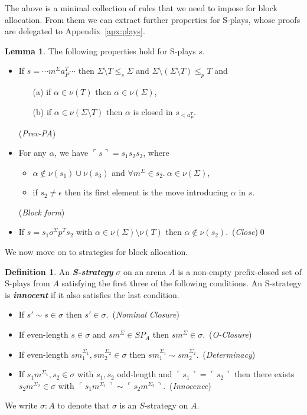 \documentclass{CSML}
\theoremstyle{definition}\newtheorem{definition}[thm]{Definition}
\theoremstyle{definition}\newtheorem{example}[thm]{Example}
\theoremstyle{definition}\newtheorem{proposition}[thm]{Proposition}
\theoremstyle{definition}\newtheorem{lemma}[thm]{Lemma}
\theoremstyle{definition}\newtheorem{theorem}[thm]{Theorem}
\theoremstyle{definition}\newtheorem{corollary}[thm]{Corollary}
\theoremstyle{definition}\newtheorem{remark}[thm]{Remark}
\newcommand\nt[1]{#1}
\renewcommand\Sigma{\varSigma}
\newcommand\Tau{T}
\newcommand\remv{\setminus}
\newcommand\Splays[1]{\mathit{SP}_{#1}}
\newcommand\boldemph[1]{\emph{\textbf{#1}}}
\newcommand\Substore{\leq_p}
\newcommand\substorE{\leq_s}
\newcommand\pview[1]{\ulcorner{#1}\urcorner}
\newcommand\pv[1]{\pview{#1}}
\newcommand\na\alpha
\begin{document}
The above is a minimal collection of rules that we need to impose for block allocation. From them we can extract further properties for S-plays, whose proofs are delegated to Appendix~\ref{apx:plays}.
\begin{lemma}
{The following properties hold for S-plays $s$.}
\begin{itemize}
\item If $s=\cdots m^\Sigma a_{P}^\Tau\cdots$ then $\Sigma\remv\Tau\substorE\Sigma$ and $\Sigma\remv(\Sigma\remv\Tau)\Substore\Tau$ and
\begin{itemize}
    \item[\quad(a)] if $\na\in\nu(\Tau)$ then $\na\in\nu(\Sigma)$,
    \item[\quad(b)] if $\na\in\nu(\Sigma\remv\Tau)$ then $\na$ is closed in $s_{<a_P^T}$.
\end{itemize}({\em Prev-PA})
\item \nt{For any $\na$, we have 
$\pv{s}=s_1s_2s_3$, where
\begin{itemize}
  \item $\na\notin\nu(s_1)\cup\nu(s_3)$ and $\forall m^\Sigma\in s_2.\ \na\in\nu(\Sigma)$,
  \item if $s_2\neq\epsilon$ then its first element is the move introducing $\na$ in $s$.
\end{itemize}
({\em Block form})}
\item If $s=s_1o^\Sigma p^\Tau s_2$ with $\na\in \nu(\Sigma)\setminus\nu(\Tau)$ then $\na\notin\nu(s_2)$.\ ({\em Close})\qed
\end{itemize}
\end{lemma}

We now move on to strategies for block allocation.

\begin{definition}
An \boldemph{S-strategy} $\sigma$ on an arena $A$ is a non-empty prefix-closed set of S-plays from $A$ satisfying the first three of the following conditions.
An S-strategy is \boldemph{innocent} if it also satisfies the last condition.
\begin{itemize}
\item If $s'\sim s\in\sigma$ then $s'\in\sigma$.\ ({\em Nominal Closure})
 \item If even-length $s\in\sigma$ and $sm^\Sigma\in\Splays{A}$ then $sm^\Sigma\in\sigma$.\ ({\em O-Closure})
 \item If even-length $sm_1^{\Sigma_1},sm_2^{\Sigma_2}\in\sigma$ then $sm_1^{\Sigma_1}\sim sm_2^{\Sigma_2}$.\ ({\em Determinacy})
\item If $s_1m^{\Sigma_1},s_2\in\sigma$ with $s_1,s_2$ odd-length and $\pv{s_1}=\pv{s_2}$ then there exists $s_2m^{\Sigma_2}\in\sigma$ with $\pv{s_1m^{\Sigma_1}}\sim \pv{s_2m^{\Sigma_2}}$.\ ({\em Innocence})
\end{itemize}
We  write $\sigma:A$ to denote that $\sigma$ is an $S$-strategy on $A$.
\end{definition}
\end{document}
